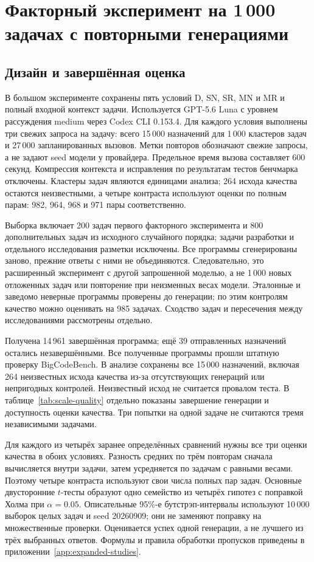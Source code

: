 \section{Факторный эксперимент на 1\,000 задачах с повторными генерациями}
\label{sec:scale-results}
\subsection{Дизайн и завершённая оценка}
В большом эксперименте сохранены пять условий D, SN, SR, MN и MR и полный входной контекст задачи. Используется GPT-5.6 Luna с уровнем рассуждения medium через Codex CLI 0.153.4. Для каждого условия выполнены три свежих запроса на задачу: всего 15\,000 назначений для 1\,000 кластеров задач и 27\,000 запланированных вызовов. Метки повторов обозначают свежие запросы, а не задают seed модели у провайдера. Предельное время вызова составляет 600 секунд. Компрессия контекста и исправления по результатам тестов бенчмарка отключены. Кластеры задач являются единицами анализа; 264 исхода качества остаются неизвестными, а четыре контраста используют оценки по полным парам: 982, 964, 968 и 971 пары соответственно.

Выборка включает 200 задач первого факторного эксперимента и 800 дополнительных задач из исходного случайного порядка; задачи разработки и отдельного исследования разметки исключены. Все программы сгенерированы заново, прежние ответы с ними не объединяются. Следовательно, это расширенный эксперимент с другой запрошенной моделью, а не 1\,000 новых отложенных задач или повторение при неизменных весах модели. Эталонные и заведомо неверные программы проверены до генерации; по этим контролям качество можно оценивать на 985 задачах. Сходство задач и пересечения между исследованиями рассмотрены отдельно.

Получена 14\,961 завершённая программа; ещё 39 отправленных назначений остались незавершёнными. Все полученные программы прошли штатную проверку BigCodeBench. В анализе сохранены все 15\,000 назначений, включая 264 неизвестных исхода качества из-за отсутствующих генераций или непригодных контролей. Неизвестный исход не считается провалом теста. В таблице~\ref{tab:scale-quality} отдельно показаны завершение генерации и доступность оценки качества. Три попытки на одной задаче не считаются тремя независимыми задачами.


Для каждого из четырёх заранее определённых сравнений нужны все три оценки качества в обоих условиях. Разность средних по трём повторам сначала вычисляется внутри задачи, затем усредняется по задачам с равными весами. Поэтому четыре контраста используют свои числа полных пар задач. Основные двусторонние $t$-тесты образуют одно семейство из четырёх гипотез с поправкой Холма при $\alpha=0.05$. Описательные 95\%-е бутстрэп-интервалы используют 10\,000 выборок целых задач и seed 20260909; они не заменяют поправку на множественные проверки. Оценивается успех одной генерации, а не лучшего из трёх выбранных ответов. Формулы и правила обработки пропусков приведены в приложении~\ref{app:expanded-studies}.

